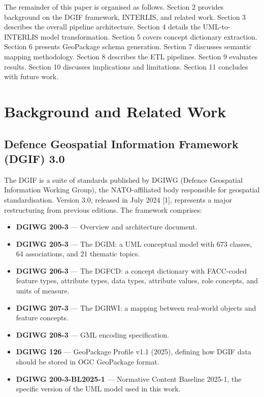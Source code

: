 \documentclass[conference]{IEEEtran}
\begin{document}
The remainder of this paper is organised as follows. Section 2 provides background on the DGIF framework, INTERLIS, and related work. Section 3 describes the overall pipeline architecture. Section 4 details the UML-to-INTERLIS model transformation. Section 5 covers concept dictionary extraction. Section 6 presents GeoPackage schema generation. Section 7 discusses semantic mapping methodology. Section 8 describes the ETL pipelines. Section 9 evaluates results. Section 10 discusses implications and limitations. Section 11 concludes with future work.



\section{Background and Related Work}

\subsection{Defence Geospatial Information Framework (DGIF) 3.0}

The DGIF is a suite of standards published by DGIWG (Defence Geospatial Information Working Group), the NATO-affiliated body responsible for geospatial standardisation. Version 3.0, released in July 2024 [1], represents a major restructuring from previous editions. The framework comprises:

\begin{itemize}[leftmargin=*]
\item \textbf{DGIWG 200-3} — Overview and architecture document.
\item \textbf{DGIWG 205-3} — The DGIM: a UML conceptual model with 673 classes, 64 associations, and 21 thematic topics.
\item \textbf{DGIWG 206-3} — The DGFCD: a concept dictionary with FACC-coded feature types, attribute types, data types, attribute values, role concepts, and units of measure.
\item \textbf{DGIWG 207-3} — The DGRWI: a mapping between real-world objects and feature concepts.
\item \textbf{DGIWG 208-3} — GML encoding specification.
\item \textbf{DGIWG 126} — GeoPackage Profile v1.1 (2025), defining how DGIF data should be stored in OGC GeoPackage format.
\item \textbf{DGIWG 200-3-BL2025-1} — Normative Content Baseline 2025-1, the specific version of the UML model used in this work.
\end{itemize}
\end{document}

